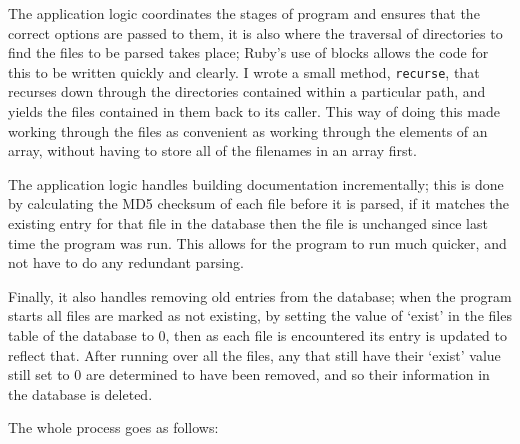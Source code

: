 The application logic coordinates the stages of program and ensures that the
correct options are passed to them, it is also where the traversal of
directories to find the files to be parsed takes place; Ruby's use of blocks
allows the code for this to be written quickly and clearly. I wrote a small
method, \lstinline|recurse|, that recurses down through the directories
contained within a particular path, and yields the files contained in them back
to its caller. This way of doing this made working through the files as
convenient as working through the elements of an array, without having to store
all of the filenames in an array first.

The application logic handles building documentation incrementally; this is done
by calculating the MD5 checksum of each file before it is parsed, if it matches
the existing entry for that file in the database then the file is unchanged
since last time the program was run. This allows for the program to run much
quicker, and not have to do any redundant parsing.

Finally, it also handles removing old entries from the database; when the
program starts all files are marked as not existing, by setting the value of
`exist' in the files table of the database to 0, then as each file is
encountered its entry is updated to reflect that. After running over all the
files, any that still have their `exist' value still set to 0 are determined to
have been removed, and so their information in the database is deleted.

The whole process goes as follows:

